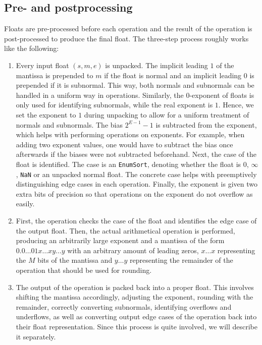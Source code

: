\documentclass[a4paper,UKenglish,cleveref, autoref, thm-restate]{lipics-v2019}
\begin{document}
\subsection{Pre- and postprocessing}
Floats are pre-processed before each operation and the result of the operation is post-processed to produce the final float. The three-step process roughly works like the following:
\begin{enumerate}
	\item Every input float $(s, m, e)$ is unpacked. The implicit leading $1$ of the mantissa is prepended to $m$ if the float is normal and an implicit leading $0$ is prepended if it is subnormal. This way, both normals and subnormals can be handled in a uniform way in operations. Similarly, the $0$-exponent of floats is only used for identifying subnormals, while the real exponent is $1$. Hence, we set the exponent to $1$ during unpacking to allow for a uniform treatment of normals and subnormals. The bias $2^{E-1} - 1$ is subtracted from the exponent, which helps with performing operations on exponents. For example, when adding two exponent values, one would have to subtract the bias once afterwards if the biases were not subtracted beforehand. Next, the case of the float is identified. The case is an \verb|EnumSort|, denoting whether the float is $0$, $\infty$, \verb|NaN| or an unpacked normal float. The concrete case helps with preemptively distinguishing edge cases in each operation. Finally, the exponent is given two extra bits of precision so that operations on the exponent do not overflow as easily.
	\item First, the operation checks the case of the float and identifies the edge case of the output float. Then, the actual arithmetical operation is performed, producing an arbitrarily large exponent and a mantissa of the form $0.0\dots01x\dots xy\dots y$ with an arbitrary amount of leading zeros, $x \dots x$ representing the $M$ bits of the mantissa and $y \dots y$ representing the remainder of the operation that should be used for rounding.
	\item The output of the operation is packed back into a proper float. This involves shifting the mantissa accordingly, adjusting the exponent, rounding with the remainder, correctly converting subnormals, identifying overflows and underflows, as well as converting output edge cases of the operation back into their float representation. Since this process is quite involved, we will describe it separately.
\end{enumerate}
\end{document}
